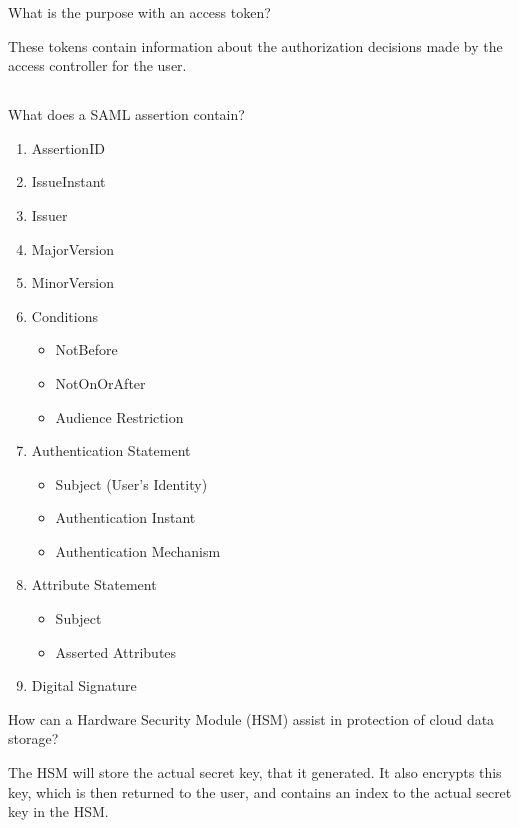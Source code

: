 \begin{questions}
\question{} What is the purpose with an access token?
  \begin{solution}
    These tokens contain information about the authorization decisions made by the access controller for the user.
  \end{solution}

  \begin{parts}
  \part{} What does a SAML assertion contain?
    \begin{solution}
      \begin{enumerate}[noitemsep]
      \item AssertionID
      \item IssueInstant
      \item Issuer
      \item MajorVersion
      \item MinorVersion
      \item Conditions
        \begin{itemize}[noitemsep]
        \item NotBefore
        \item NotOnOrAfter
        \item Audience Restriction
        \end{itemize}
      \item Authentication Statement
        \begin{itemize}[noitemsep]
        \item Subject (User's Identity)
        \item Authentication Instant
        \item Authentication Mechanism
        \end{itemize}
      \item Attribute Statement
        \begin{itemize}[noitemsep]
        \item Subject
        \item Asserted Attributes
        \end{itemize}
      \item Digital Signature
      \end{enumerate}
    \end{solution}
  \end{parts}

\question{} How can a Hardware Security Module (HSM) assist in protection of cloud data storage?
  \begin{solution}
    The HSM will store the actual secret key, that it generated.
    It also encrypts this key, which is then returned to the user, and contains an index to the actual secret key in the HSM.\@


\end{solution}
\end{questions}

